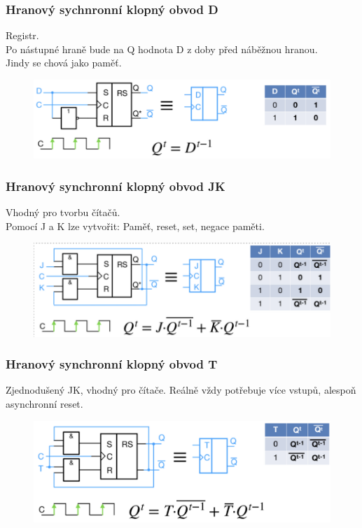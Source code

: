 \subsubsection{Hranový sychnronní klopný obvod D}
Registr. \\
Po nástupné hraně bude na Q hodnota D z doby před náběžnou hranou. \\
Jindy se chová jako paměť.\\
\begin{figure}[h!]
    \centering
    \includegraphics*[scale = 0.5]{img/DHran.png}
\end{figure}

\subsubsection{Hranový synchronní klopný obvod JK}
Vhodný pro tvorbu čítačů.\\
Pomocí J a K lze vytvořit: Paměť, reset, set, negace paměti.\\
\begin{figure}[h!]
    \centering
    \includegraphics[scale = 0.5]{img/JK.png}
\end{figure}

\subsubsection{Hranový synchronní klopný obvod T}
Zjednodušený JK, vhodný pro čítače. Reálně vždy potřebuje více vstupů, alespoň asynchronní reset. \\
\begin{figure}[h!]
    \centering
    \includegraphics[scale = 0.3]{img/T.png}
\end{figure}

